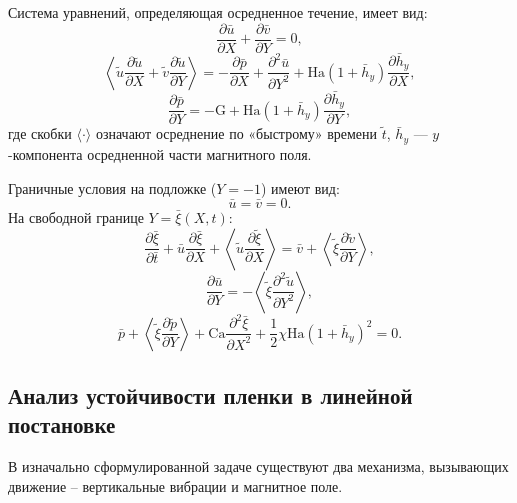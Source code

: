 \documentclass[12pt,a4paper]{article}
\begin{document}
Система уравнений, определяющая осредненное течение, имеет вид:
\begin{equation}
	\frac{\partial \bar{u}}{\partial X} + \frac{\partial \bar{v}}{\partial Y} = 0,
\end{equation}
\begin{equation}
	\left< \tilde{u} \frac{\partial \tilde{u}}{\partial X} + \tilde{v} \frac{\partial \tilde{u}}{\partial Y} \right> = 
	-\frac{\partial \bar{p}}{\partial X} + \frac{\partial^2 \bar{u}}{\partial Y^2} + 
	\mathrm{Ha}(1 + \bar{h}_y) \frac{\partial \bar{h}_y}{\partial X},
\end{equation}
\begin{equation}
	\frac{\partial \bar{p}}{\partial Y} = -\mathrm{G} + \mathrm{Ha}(1 + \bar{h}_y) \frac{\partial \bar{h}_y}{\partial Y},
\end{equation}
где скобки $\langle \cdot \rangle$ означают осреднение по «быстрому» времени $\tilde{t}$, $\bar{h}_y$ — $y$-компонента осредненной части магнитного поля.

Граничные условия на подложке ($Y = -1$) имеют вид:
\begin{equation}
	\bar{u} = \bar{v} = 0.
\end{equation}
На свободной границе $Y = \bar{\xi}(X, t)$:
\begin{equation}
	\frac{\partial \bar{\xi}}{\partial \bar{t}} + \bar{u} \frac{\partial \bar{\xi}}{\partial X} + 
	\left< \tilde{u} \frac{\partial \tilde{\xi}}{\partial X} \right> = 
	\bar{v} + \left< \tilde{\xi} \frac{\partial \tilde{v}}{\partial Y} \right>,
\end{equation}
\begin{equation}
	\frac{\partial \bar{u}}{\partial Y} = -\left< \tilde{\xi} \frac{\partial^2 \tilde{u}}{\partial Y^2} \right>,
\end{equation}
\begin{equation}
	\bar{p} + \left< \tilde{\xi} \frac{\partial \tilde{p}}{\partial Y} \right> + 
	\mathrm{Ca} \frac{\partial^2 \bar{\xi}}{\partial X^2} + \frac{1}{2} \chi \mathrm{Ha} (1 + \bar{h}_y)^2 = 0.
\end{equation}



\subsection{Анализ устойчивости пленки в линейной постановке}

В изначально сформулированной задаче существуют два механизма, вызывающих движение -- вертикальные вибрации и магнитное поле. 
\end{document}
